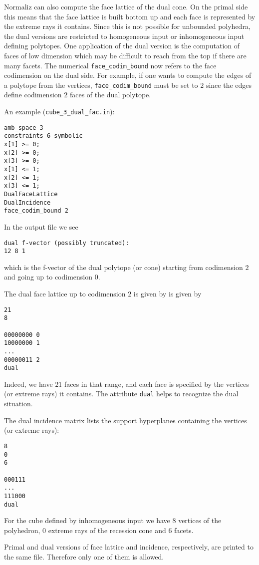 \documentclass[12pt,a4paper]{scrartcl}
\theoremstyle{definition}
\begin{document}
Normaliz can also compute the face lattice of the dual cone. On the primal side this means that the face lattice is built bottom up and each face is represented by the extreme rays it contains. Since this is not possible for unbounded polyhedra, the dual versions are restricted to homogeneous input or inhomogeneous input defining polytopes. One application of the dual version is the computation of faces of low dimension which may be difficult to reach from the top if there are many facets. The numerical \verb|face_codim_bound| now refers to the face codimension on the dual side. For example, if one wants to compute the edges of a polytope from the vertices, \verb|face_codim_bound| must be set to $2$ since the edges define codimension $2$ faces of the dual polytope.

An example (\verb|cube_3_dual_fac.in|):
\begin{Verbatim}
amb_space 3
constraints 6 symbolic
x[1] >= 0;
x[2] >= 0;
x[3] >= 0;
x[1] <= 1;
x[2] <= 1;
x[3] <= 1;
DualFaceLattice
DualIncidence
face_codim_bound 2
\end{Verbatim}

In the output file we see
\begin{Verbatim}
dual f-vector (possibly truncated):
12 8 1
\end{Verbatim}
which is the f-vector of the dual polytope (or cone) starting from codimension $2$ and going up to codimension $0$.

The dual face lattice up to codimension $2$ is given by is given by
\begin{Verbatim}
21
8

00000000 0
10000000 1
...
00000011 2
dual
\end{Verbatim}
Indeed, we have $21$ faces in that range, and each face is specified by the vertices (or extreme rays) it contains. The attribute \verb|dual| helps to recognize the dual situation.

The dual incidence matrix lists the support hyperplanes containing the vertices (or extreme rays):
\begin{Verbatim}
8
0
6

000111
...
111000
dual
\end{Verbatim}
For the cube defined by inhomogeneous input we have $8$ vertices of the polyhedron, $0$ extreme rays of the recession cone and $6$ facets.

Primal and dual versions of face lattice and incidence, respectively, are printed to the same file. Therefore only one of them is allowed.
\end{document}
